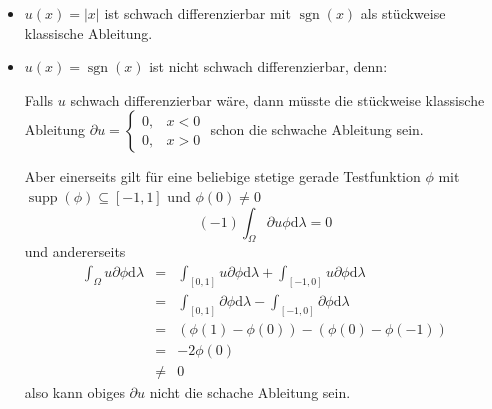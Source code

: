 \documentclass{book}
\newcommand{\mathd}{\mathrm{d}}
\newcommand{\tmdummy}{$\mbox{}$}
\newcommand{\tmop}[1]{\ensuremath{\operatorname{#1}}}
\newenvironment{itemizedot}{\begin{itemize} \renewcommand{\labelitemi}{$\bullet$}\renewcommand{\labelitemii}{$\bullet$}\renewcommand{\labelitemiii}{$\bullet$}\renewcommand{\labelitemiv}{$\bullet$}}{\end{itemize}}
\begin{document}
\begin{example*}
  {\tmdummy}
  
  \begin{itemizedot}
    \item $u (x) = | x |$ ist schwach differenzierbar mit $\tmop{sgn} (x)$ als
    st{\"u}ckweise klassische Ableitung.
    
    \item $u (x) = \tmop{sgn} (x)$ ist nicht schwach differenzierbar, denn:
    
    Falls $u$ schwach differenzierbar w{\"a}re, dann m{\"u}sste die
    st{\"u}ckweise klassische Ableitung $\partial u = \left\{\begin{array}{ll}
      0, & x < 0\\
      0, & x > 0
    \end{array}\right.$ schon die schwache Ableitung sein.
    
    Aber einerseits gilt f{\"u}r eine beliebige stetige gerade Testfunktion
    $\phi$ mit $\tmop{supp} (\phi) \subseteq [- 1, 1]$ und $\phi (0) \neq 0$
    \[ (- 1) \int_{\Omega} \partial u \phi \mathd \lambda = 0 \]
    und andererseits
    \begin{eqnarray*}
      \int_{\Omega} u \partial \phi \mathd \lambda & = & \int_{[0, 1]} u
      \partial \phi \mathd \lambda + \int_{[- 1, 0]} u \partial \phi \mathd
      \lambda\\
      & = & \int_{[0, 1]} \partial \phi \mathd \lambda - \int_{[- 1, 0]}
      \partial \phi \mathd \lambda\\
      & = & (\phi (1) - \phi (0)) - (\phi (0) - \phi (- 1))\\
      & = & - 2 \phi (0)\\
      & \neq & 0
    \end{eqnarray*}
    also kann obiges $\partial u$ nicht die schache Ableitung sein. 
  \end{itemizedot}
\end{example*}
\end{document}
